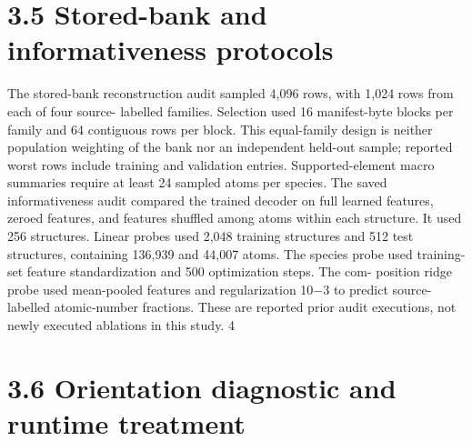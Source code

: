 \documentclass[11pt]{article}
\begin{document}
\section*{3.5 Stored-bank and informativeness protocols}

The stored-bank reconstruction audit sampled 4,096 rows, with 1,024 rows from each of four source-
labelled families. Selection used 16 manifest-byte blocks per family and 64 contiguous rows per
block. This equal-family design is neither population weighting of the bank nor an independent
held-out sample; reported worst rows include training and validation entries. Supported-element
macro summaries require at least 24 sampled atoms per species.
The saved informativeness audit compared the trained decoder on full learned features, zeroed
features, and features shuffled among atoms within each structure. It used 256 structures. Linear
probes used 2,048 training structures and 512 test structures, containing 136,939 and 44,007 atoms.
The species probe used training-set feature standardization and 500 optimization steps. The com-
position ridge probe used mean-pooled features and regularization 10\ensuremath{-}3 to predict source-labelled
atomic-number fractions. These are reported prior audit executions, not newly executed ablations
in this study.
4


\section*{3.6 Orientation diagnostic and runtime treatment}
\end{document}
